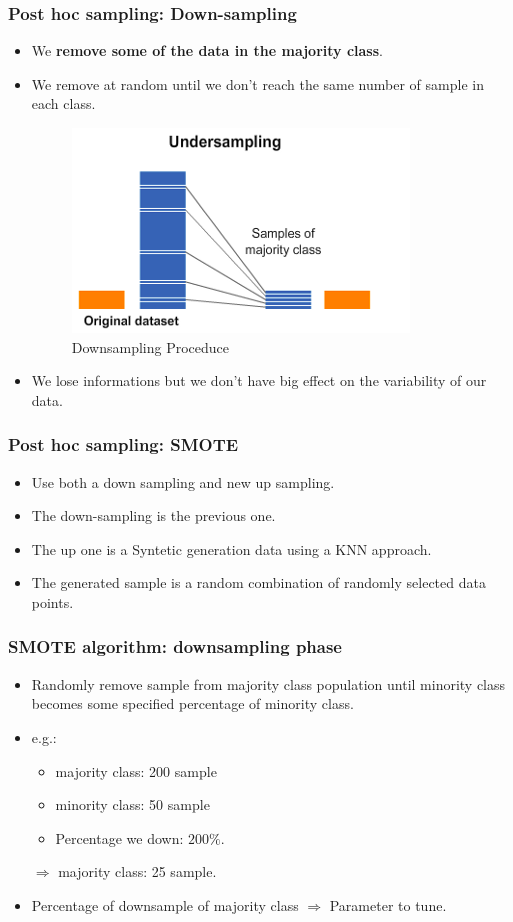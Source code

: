 \documentclass[9pt]{beamer}
\begin{document}
\begin{frame}
\frametitle{Post hoc sampling: Down-sampling}
\begin{itemize}
\item<1->  We \textbf{remove some of the data in the majority class}.
\item<2->  We remove at random until we don't reach the same number of sample in each class.
\begin{figure}[ht]
\includegraphics[scale=0.60]{images/Undersampling.png}
\caption{Downsampling Proceduce}
\end{figure}
\item<3->  We lose informations but we don't have big effect on the variability of our data.

\end{itemize}
\end{frame}

\begin{frame}
\frametitle{Post hoc sampling: SMOTE}
\begin{itemize}
\item<1->  Use both a down sampling and new up sampling.
\item<2->  The down-sampling is the previous one.
\item<3->  The up one is a Syntetic generation data using a KNN approach.
\item<4->  The generated sample is a random combination of randomly selected data points.
\end{itemize}
\end{frame}

\begin{frame}
\frametitle{SMOTE algorithm: downsampling phase}
\begin{itemize}
\item<1->  Randomly remove sample from majority class population until minority class becomes some specified percentage of minority class. 
\item<2->  e.g.: 
\begin{itemize}
\item majority class: 200 sample
\item minority class: 50 sample
\item Percentage we down: $200\%$.
\end{itemize}
$\Rightarrow$ majority class: 25 sample.
\item<3->  Percentage of downsample of majority class $\Rightarrow$ Parameter to tune.
\end{itemize}
\end{frame}
\end{document}
